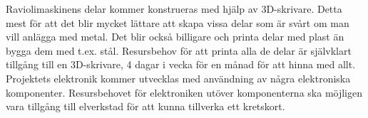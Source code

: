 Raviolimaskinens delar kommer konstrueras med hjälp av 3D-skrivare. Detta mest för att det blir mycket lättare att skapa vissa delar som är svårt om man vill anlägga med metal. Det blir också billigare och printa delar med plast än bygga dem med t.ex. stål. Resursbehov för att printa alla de delar är självklart tillgång till en 3D-skrivare, 4 dagar i vecka för en månad för att hinna med allt.\\

Projektets elektronik kommer utvecklas med användning av några elektroniska komponenter. Resursbehovet för elektroniken utöver komponenterna ska möjligen vara tillgång till elverkstad för att kunna tillverka ett kretskort.\\

